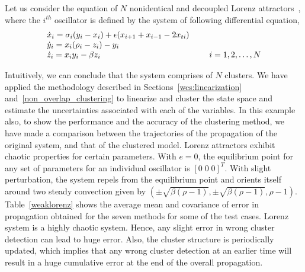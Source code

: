 Let us consider the equation of $N$ nonidentical and decoupled Lorenz attractors~\cite{lorenz1963deterministic}, where the $i^{th}$ oscillator is defined by the system of following differential equation,  
\begin{equation}
\begin{array}{lc}
\dot{x}_{i} = \sigma_i (y_{i} - x_{i}) + \epsilon (x_{i+1} + x_{i-1} - 2x_{ti})  \\
\dot{y}_{i} = x_{i}(\rho_i - z_i) - y_{i} \\
\dot{z}_{i} = x_{i}y_{i} - \beta z_{i} & \hspace{5 mm}
i = 1,2,\ldots,N
\end{array} 
\end{equation} %

Intuitively, we can conclude that the system comprises of $N$ clusters. We have applied the methodology described in Sections~\ref{wcs:linearization} and~\ref{non_overlap_clustering} to linearize and cluster the state space and estimate the uncertainties associated with each of the variables. In this example also, to show the performance and the accuracy of the clustering method, we have made a comparison between the trajectories of the propagation of the original system, and that of the clustered model. Lorenz attractors exhibit chaotic properties for certain parameters. With $e = 0$, the equilibrium point for any set of parameters for an individual oscillator is $[0 \; 0 \; 0]^T$. With slight perturbation, the system repels from the equilibrium point and orients itself around two steady convection given by $\left( \pm\sqrt{\beta(\rho-1)}, \pm\sqrt{\beta(\rho-1)}, \rho-1 \right)$. Table~\ref{weaklorenz} shows the average mean and covariance of error in propagation obtained for the seven methods for some of the test cases. Lorenz system is a highly chaotic system. Hence, any slight error in wrong cluster detection can lead to huge error. Also, the cluster structure is periodically updated, which implies that any wrong cluster detection at an earlier time will result in a huge cumulative error at the end of the overall propagation. 

